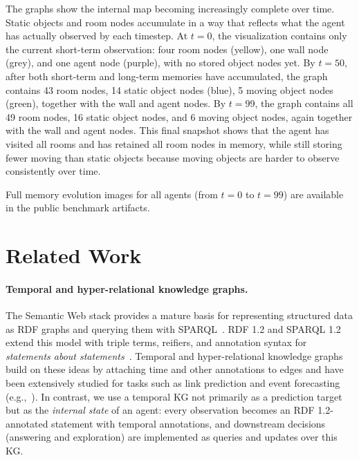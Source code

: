 \documentclass[Afour,sageh,times]{sagej}
\begin{document}
The graphs show the internal map becoming increasingly complete over time. Static
objects and room nodes accumulate in a way that reflects what the agent has actually
observed by each timestep. At $t=0$, the visualization contains only the current
short-term observation: four room nodes (yellow), one wall node (grey), and one agent
node (purple), with no stored object nodes yet. By $t=50$, after both short-term and
long-term memories have accumulated, the graph contains 43 room nodes, 14 static object
nodes (blue), 5 moving object nodes (green), together with the wall and agent nodes. By
$t=99$, the graph contains all 49 room nodes, 16 static object nodes, and 6 moving
object nodes, again together with the wall and agent nodes. This final snapshot shows
that the agent has visited all rooms and has retained all room nodes in memory, while
still storing fewer moving than static objects because moving objects are harder to
observe consistently over time.

Full memory evolution images for all agents (from $t=0$ to $t=99$) are available in the
public benchmark artifacts.




\section{Related Work}
\label{sec:related_work}

\paragraph{Temporal and hyper-relational knowledge graphs.}
The Semantic Web stack provides a mature basis for representing structured data as RDF
graphs and querying them with SPARQL~\citep{Seaborne:13:SQL}. RDF 1.2 and SPARQL 1.2
extend this model with triple terms, reifiers, and annotation syntax for
\emph{statements about statements}~\citep{rdf12concepts,rdf12turtle,sparql12query}.
Temporal and hyper-relational knowledge graphs build on these ideas by attaching time and other
annotations to edges and have been extensively studied for tasks such as link prediction
and event forecasting (e.g.,~\citep{DBLP:journals/corr/abs-1809-03202}). In contrast, we
use a temporal KG not primarily as a prediction target but as the \emph{internal state}
of an agent: every observation becomes an RDF 1.2-annotated statement with temporal
annotations, and downstream decisions (answering and exploration) are implemented as
queries and updates over this KG.
\end{document}
